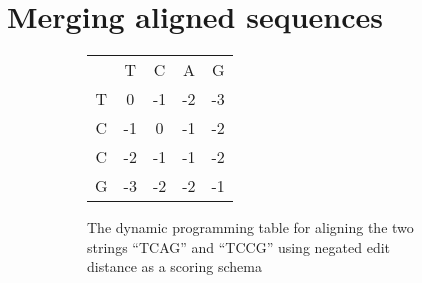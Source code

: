 \documentclass[thesis.tex]{subfiles}
\begin{document}
\section{Merging aligned sequences}
\label{sec:merge}
\begin{wrapfigure}{r}{0.5\textwidth}
  \begin{mdframed}
    \begin{subfigure}[t]{\textwidth}
      \begin{mdframed}
        \begin{center}
          \begin{tabularx}{\linewidth}{ccccc}
            & T & C & A & G \\ \cline{2-5}
            T & \multicolumn{1}{|c|}{0} & -1 & \multicolumn{1}{|c|}{-2} & \multicolumn{1}{c|}{-3} \\ \cline{2-5}
            C & \multicolumn{1}{|c|}{-1} & 0 & \multicolumn{1}{|c|}{-1} & \multicolumn{1}{c|}{-2} \\ \cline{2-5}
            C & \multicolumn{1}{|c|}{-2} & -1 & \multicolumn{1}{|c|}{-1} & \multicolumn{1}{c|}{-2} \\ \cline{2-5}
            G & \multicolumn{1}{|c|}{-3} & -2 & \multicolumn{1}{|c|}{-2} & \multicolumn{1}{c|}{-1} \\ \cline{2-5}
          \end{tabularx}
        \end{center}
      \end{mdframed}
      \caption{The dynamic programming table for aligning the two strings ``TCAG'' and ``TCCG'' using negated edit distance as a scoring schema}
    \end{subfigure}
    \begin{subfigure}[t]{\textwidth}
      \begin{mdframed}
        \begin{center}
\end{center}
\end{mdframed}
\end{subfigure}
\end{mdframed}
\end{wrapfigure}
\end{document}
